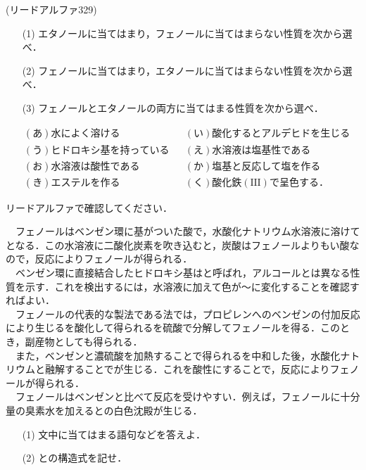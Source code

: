 \documentclass[a4paper,12pt]{ltjsreport}
\begin{document}
\newpage
\begin{que}
(リードアルファ329)
\begin{itemize}
    \item [(1)]エタノールに当てはまり，フェノールに当てはまらない性質を次から選べ．
\item [(2)]フェノールに当てはまり，エタノールに当てはまらない性質を次から選べ．
\item [(3)]フェノールとエタノールの両方に当てはまる性質を次から選べ．
\end{itemize}
\begin{align*}
&(あ)水によく溶ける&&(い)酸化するとアルデヒドを生じる\\
&(う)ヒドロキシ基を持っている&&(え)水溶液は塩基性である\\
&(お)水溶液は酸性である&&(か)塩基と反応して塩を作る\\
&(き)エステルを作る&&(く)酸化鉄(\text{III})で呈色する．
\end{align*}
\end{que}
\ans 
リードアルファで確認してください．
\newpage
\begin{que} 　フェノールはベンゼン環に基がついた酸で，水酸化ナトリウム水溶液に溶けてとなる．この水溶液に二酸化炭素を吹き込むと，炭酸はフェノールよりもい酸なので，反応によりフェノールが得られる．\\
 　ベンゼン環に直接結合したヒドロキシ基はと呼ばれ，アルコールとは異なる性質を示す．これを検出するには，水溶液に加えて色が〜に変化することを確認すればよい．\\
 　フェノールの代表的な製法である法では，プロピレンへのベンゼンの付加反応により生じるを酸化して得られるを硫酸で分解してフェノールを得る．このとき，副産物としても得られる．\\
 　また，ベンゼンと濃硫酸を加熱することで得られるを中和した後，水酸化ナトリウムと融解することでが生じる．これを酸性にすることで，反応によりフェノールが得られる．\\
　フェノールはベンゼンと比べて反応を受けやすい．例えば，フェノールに十分量の臭素水を加えるとの白色沈殿が生じる．
 \begin{itemize}
    \item [(1)]文中に当てはまる語句などを答えよ．
    \item [(2)]との構造式を記せ．
 \end{itemize}
\end{que}
\end{document}
